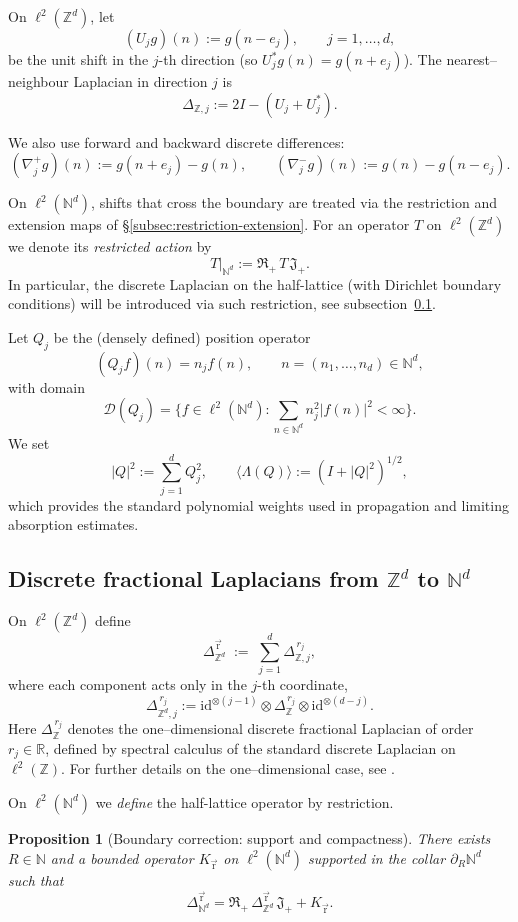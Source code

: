 \documentclass[10pt]{amsart}
\newcommand{\R}{{\mathbb{R}}}
\newcommand{\Z}{{\mathbb{Z}}}
\newcommand{\N}{{\mathbb{N}}}
\newcommand{\1}{{\mathbb{I}}}
\numberwithin{equation}{section}
\newtheorem{proposition}[theorem]{Proposition}%
\begin{document}
On $\ell^2(\mathbb{Z}^d)$, let
\[
(U_j g)(n) := g(n-e_j), \qquad j=1,\dots,d,
\]
be the unit shift in the $j$-th direction (so $U_j^* g(n)=g(n+e_j)$).
The nearest--neighbour Laplacian in direction $j$ is
\[
\Delta_{\mathbb{Z},j} := 2I - (U_j+U_j^*).
\]

We also use forward and backward discrete differences:
\[
(\nabla_j^+ g)(n) := g(n+e_j)-g(n),
\qquad
(\nabla_j^- g)(n) := g(n)-g(n-e_j).
\]

On $\ell^2(\mathbb{N}^d)$, shifts that cross the boundary are treated via the restriction and extension maps of \S\ref{subsec:restriction-extension}.
For an operator $T$ on $\ell^2(\mathbb{Z}^d)$ we denote its \emph{restricted action} by
\[
T|_{\N^d} := \mathfrak{R}_+\, T \,\mathfrak{J}_+.
\]
In particular, the discrete Laplacian on the half-lattice (with Dirichlet boundary conditions) will be introduced via such restriction, see subsection~\ref{subsec:fractional}.

\medskip

Let $Q_j$ be the (densely defined) position operator
\[
(Q_j f)(n) = n_j f(n), \qquad n=(n_1,\dots,n_d)\in \N^d,
\]
with domain
\[
\mathcal{D}(Q_j) = \Big\{ f\in \ell^2(\N^d): \sum_{n\in\N^d} n_j^2 |f(n)|^2 < \infty \Big\}.
\]
We set
\[
|Q|^2 := \sum_{j=1}^d Q_j^2,
\qquad
\langle \Lambda(Q)\rangle := (I+|Q|^2)^{1/2},
\]
which provides the standard polynomial weights used in propagation and limiting absorption estimates.
\subsection{Discrete  fractional  Laplacians from $\mathbb{Z}^d$ to $\mathbb{N}^d$}
\label{subsec:fractional}
On $\ell^2(\mathbb{Z}^d)$ define
\[
\Delta_{\mathbb{Z}^d}^{\vec{\mathrm{r}}} \;:=\; \sum_{j=1}^d \Delta_{\mathbb{Z},j}^{\,r_j},
\]
where each component acts only in the $j$-th coordinate,
\[
\Delta_{\Z^d,j}^{\,r_j}
:= \mathrm{id}^{\otimes (j-1)} \otimes \Delta_{\Z}^{\,r_j} \otimes \mathrm{id}^{\otimes (d-j)}.
\]
Here $\Delta_{\Z}^{\,r_j}$ denotes the one--dimensional discrete fractional Laplacian of order $r_j\in\R$,
defined by spectral calculus of the standard discrete Laplacian on $\ell^2(\Z)$.
For further details on the one--dimensional case, see \cite{At}.

On $\ell^2(\mathbb{N}^d)$ we \emph{define} the half-lattice operator by restriction.
\begin{proposition}[Boundary correction: support and compactness]\label{prop:K-support-compact}
There exists $R\in\mathbb{N}$ and a bounded operator $K_{\vec{\mathrm{r}}}$ on $\ell^2(\mathbb{N}^d)$ supported in the collar $\partial_R\mathbb{N}^d$ such that
\begin{equation}\label{eq:boundary-restriction}
\Delta_{\mathbb{N}^d}^{\vec{\mathrm{r}}}=\mathfrak{R}_+\,\Delta_{\mathbb{Z}^d}^{\vec{\mathrm{r}}}\,\mathfrak{J}_+ + K_{\vec{\mathrm{r}}}.
\end{equation}

\end{proposition}
\end{document}
